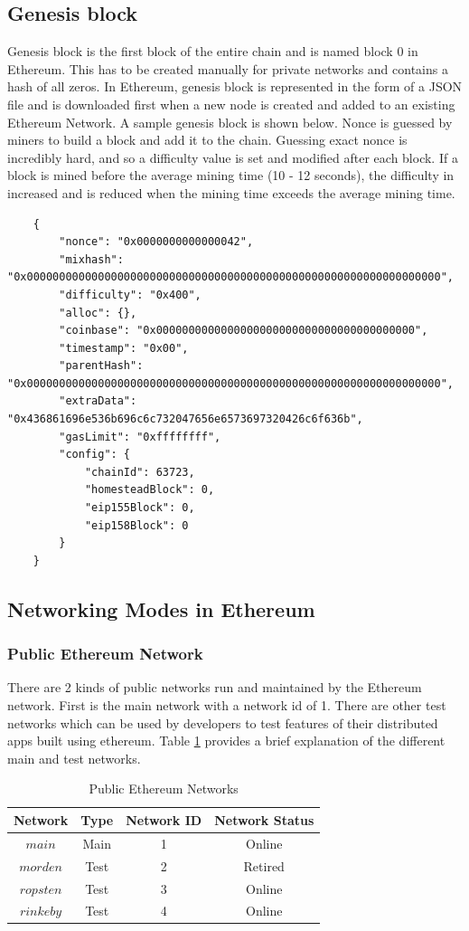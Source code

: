 \documentclass[11pt,openright]{report}
\begin{document}
\subsection{Genesis block}
Genesis block is the first block of the entire chain and is named block 0 in Ethereum. This has to be created manually for private networks and contains a hash of all zeros. In Ethereum, genesis block is represented in the form of a JSON file and is downloaded first when a new node is created and added to an existing Ethereum Network. A sample genesis block is shown below. Nonce is guessed by miners to build a block and add it to the chain. Guessing exact nonce is incredibly hard, and so a difficulty value is set and modified after each block. If a block is mined before the average mining time (10 - 12 seconds), the difficulty in increased and is reduced when the mining time exceeds the average mining time.
\begin{verbatim}
    {
        "nonce": "0x0000000000000042",
        "mixhash": "0x0000000000000000000000000000000000000000000000000000000000000000",
        "difficulty": "0x400",
        "alloc": {}, 
        "coinbase": "0x0000000000000000000000000000000000000000",
        "timestamp": "0x00",
        "parentHash": "0x0000000000000000000000000000000000000000000000000000000000000000",
        "extraData": "0x436861696e536b696c6c732047656e6573697320426c6f636b",
        "gasLimit": "0xffffffff",
        "config": {
            "chainId": 63723,
            "homesteadBlock": 0,
            "eip155Block": 0,
            "eip158Block": 0
        }
    }
\end{verbatim}
\newpage

\subsection{Networking Modes in Ethereum}
\subsubsection{Public Ethereum Network}
There are 2 kinds of public networks run and maintained by the Ethereum network. 
First is the main network with a network id of 1. There are other test networks which can be used by developers to test features of their distributed apps built using ethereum. Table \ref{pub_eth_networks} provides a brief explanation of the different main and test networks. 

\begin{table}[!htbp]
	\renewcommand{\arraystretch}{1.3}
	\caption{Public Ethereum Networks}
	\label{pub_eth_networks}
	\centering
	\begin{tabular}{|c||c|c|c|}
		\hline
		\bfseries Network & \bfseries Type & \bfseries Network ID & \bfseries Network Status \\
		\hline\hline
		$main$ & Main & 1 & Online \\ \hline
		$morden$ & Test & 2 & Retired \\ \hline
		$ropsten$ & Test & 3 & Online \\ \hline
		$rinkeby$ & Test & 4 & Online \\ \hline
	\end{tabular}
\end{table}
\end{document}
